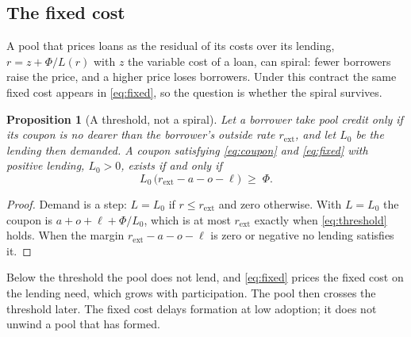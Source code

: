 \documentclass[10pt,a4paper]{article}
\newtheorem{proposition}{Proposition}
\theoremstyle{remark}
\begin{document}
\subsection{The fixed cost}
A pool that prices loans as the residual of its costs over its lending,
\(r=z+\Phi/L(r)\) with \(z\) the variable cost of a loan, can spiral: fewer borrowers raise the price, and a higher
price loses borrowers. Under this contract the same fixed cost appears
in \eqref{eq:fixed}, so the question is whether the spiral survives.
\begin{proposition}[A threshold, not a spiral]
\label{prop:threshold}
Let a borrower take pool credit only if its coupon is no dearer than the
borrower's outside rate \(r_{\mathrm{ext}}\), and let \(L_0\) be the lending
then demanded. A coupon satisfying \eqref{eq:coupon} and \eqref{eq:fixed}
with positive lending, \(L_0>0\), exists if and only if
\begin{equation}
L_0\,\bigl(r_{\mathrm{ext}}-a-o-\ell\bigr) \;\ge\; \Phi .
\label{eq:threshold}
\end{equation}
\end{proposition}
\begin{proof}
Demand is a step: \(L=L_0\) if \(r\le r_{\mathrm{ext}}\) and zero otherwise.
With \(L=L_0\) the coupon is \(a+o+\ell+\Phi/L_0\), which is at most
\(r_{\mathrm{ext}}\) exactly when \eqref{eq:threshold} holds. When the margin
\(r_{\mathrm{ext}}-a-o-\ell\) is zero or negative no lending satisfies it.
\end{proof}
Below the threshold the pool does not lend, and \eqref{eq:fixed} prices the
fixed cost on the lending need, which grows with participation. The pool
then crosses the threshold later. The fixed cost delays formation at low
adoption; it does not unwind a pool that has formed.
\end{document}
